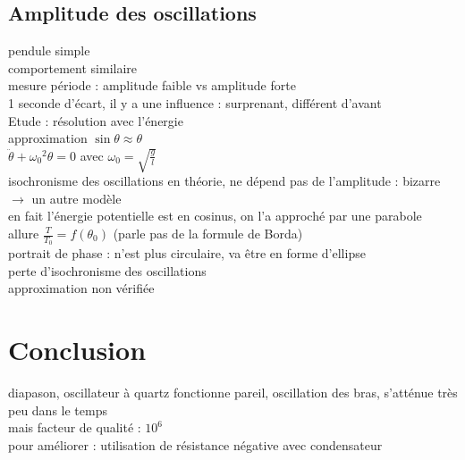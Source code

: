 \subsection{Amplitude des oscillations} 
pendule simple \\
comportement similaire \\
mesure période : amplitude faible vs amplitude forte \\
1 seconde d'écart, il y a une influence : surprenant, différent d'avant \\
Etude : résolution avec l'énergie \\
approximation $\sin{\theta} \approx \theta $ \\
$\ddot{\theta} + {\omega_0}^2 \theta =0$  avec $\omega_0=\sqrt{\frac{g}{l}}$ \\
isochronisme des oscillations en théorie, ne dépend pas de l'amplitude : bizarre $\rightarrow$ un autre modèle \\
en fait l'énergie potentielle est en cosinus, on l'a approché par une parabole \\
allure $\frac{T}{T_0}=f(\theta_0)$ (parle pas de la formule de Borda) \\
portrait de phase : n'est plus circulaire, va être en forme d'ellipse \\
perte d'isochronisme des oscillations \\
approximation non vérifiée \\


\section*{Conclusion}
diapason, oscillateur à quartz fonctionne pareil, oscillation des bras, s'atténue très peu dans le temps \\
mais facteur de qualité : $10^6$ \\
pour améliorer : utilisation de résistance négative avec condensateur \\

